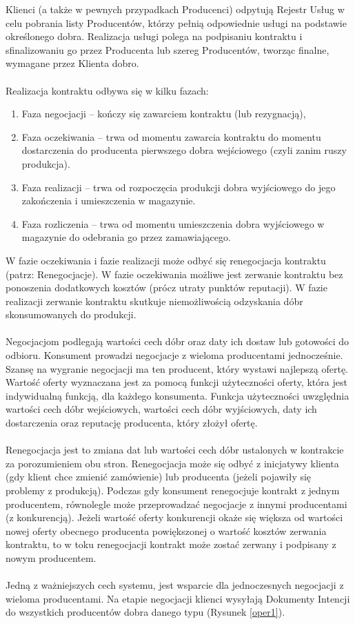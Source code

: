 \documentclass[a4paper,12pt]{article}
\begin{document}
Klienci (a także w pewnych przypadkach Producenci) odpytują Rejestr Usług w celu pobrania listy Producentów, którzy pełnią odpowiednie usługi na podstawie określonego dobra. Realizacja usługi polega na podpisaniu kontraktu i sfinalizowaniu go przez Producenta lub szereg Producentów, tworząc finalne, wymagane przez Klienta dobro.
\\ \\
Realizacja kontraktu odbywa się w kilku fazach:
\begin{enumerate}
\item Faza negocjacji – kończy się zawarciem kontraktu (lub rezygnacją),
\item Faza oczekiwania – trwa od momentu zawarcia kontraktu do momentu dostarczenia do producenta pierwszego dobra wejściowego (czyli zanim ruszy produkcja).
\item Faza realizacji – trwa od rozpoczęcia produkcji dobra wyjściowego do jego zakończenia i umieszczenia w magazynie.
\item Faza rozliczenia – trwa od momentu umieszczenia dobra wyjściowego w magazynie do odebrania go przez zamawiającego.
\end{enumerate}
W fazie oczekiwania i fazie realizacji może odbyć się renegocjacja kontraktu (patrz: Renegocjacje). W fazie oczekiwania możliwe jest zerwanie kontraktu bez ponoszenia dodatkowych kosztów (prócz utraty  punktów reputacji). W fazie realizacji zerwanie kontraktu skutkuje niemożliwością odzyskania dóbr skonsumowanych do produkcji.
\\ \\
Negocjacjom podlegają wartości cech dóbr oraz daty ich dostaw lub gotowości do odbioru. Konsument prowadzi negocjacje z wieloma producentami jednocześnie. Szansę na wygranie negocjacji ma ten producent, który wystawi najlepszą ofertę.
Wartość oferty wyznaczana jest za pomocą funkcji użyteczności oferty, która jest indywidualną funkcją, dla każdego konsumenta. Funkcja użyteczności uwzględnia wartości cech dóbr wejściowych, wartości cech dóbr wyjściowych, daty ich dostarczenia oraz reputację producenta, który złożył ofertę.
\\ \\
Renegocjacja jest to zmiana dat lub wartości cech dóbr ustalonych w kontrakcie za porozumieniem obu stron. Renegocjacja może się odbyć z inicjatywy klienta (gdy klient chce zmienić zamówienie) lub producenta (jeżeli pojawiły się problemy z produkcją).
Podczas gdy konsument renegocjuje kontrakt z jednym producentem, równolegle może przeprowadzać negocjacje z innymi producentami (z konkurencją). Jeżeli wartość oferty konkurencji okaże się większa od wartości nowej oferty obecnego producenta powiększonej o wartość kosztów zerwania kontraktu, to w toku renegocjacji kontrakt może zostać zerwany i podpisany z nowym producentem.
\\ \\
Jedną z ważniejszych cech systemu, jest wsparcie dla jednoczesnych negocjacji z wieloma producentami. Na etapie negocjacji klienci wysyłają Dokumenty Intencji do wszystkich producentów dobra danego typu (Rysunek \ref{oper1}).
\end{document}
